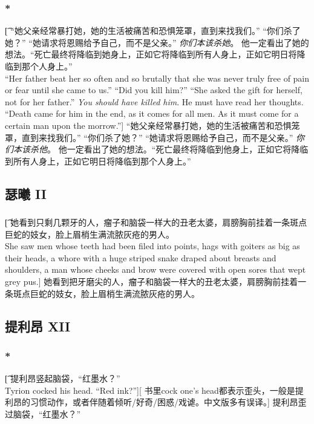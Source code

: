 \documentclass[12pt,a4paper]{article}
\begin{document}
\subsubsection{\color{red}*}\t[
	“她父亲经常暴打她，她的生活被痛苦和恐惧笼罩，直到来找我们。”
	“你们杀了她？”
	“她请求将恩赐给予自己，而不是父亲。”
	\emph{你们本该杀她}。
	他一定看出了她的想法。“死亡最终将降临到她身上，正如它将降临到所有人身上，正如它明日将降临到那个人身上。”\\
	“Her father beat her so often and so brutally that she was never truly free of pain or fear until she came to us.”
	“Did you kill him?”
	“She asked the gift for herself, not for her father.”
	\emph{You should have killed him}.
	He must have read her thoughts. “Death came for him in the end, as it comes for all men. As it must come for a certain man upon the morrow.”]
	“她父亲经常暴打她，她的生活被痛苦和恐惧笼罩，直到来找我们。”
	“你们杀了她？”
	“她请求将恩赐给予自己，而不是父亲。”
	\emph{你们本该杀他}。
	他一定看出了她的想法。“死亡最终将降临到他身上，正如它将降临到所有人身上，正如它明日将降临到那个人身上。”


\subsection{瑟曦 II}
\subsubsection{}\t[
	她看到只剩几颗牙的人，瘤子和脑袋一样大的丑老太婆，肩膀胸前挂着一条斑点巨蛇的妓女，脸上眉梢生满流脓灰疮的男人。\\
	She saw men whose teeth had been filed into points, hags with goiters as big as their heads, a whore with a huge striped snake draped about breasts and shoulders, a man whose cheeks and brow were covered with open sores that wept grey pus.]
	她看到把牙磨尖的人，瘤子和脑袋一样大的丑老太婆，肩膀胸前挂着一条斑点巨蛇的妓女，脸上眉梢生满流脓灰疮的男人。
	
\subsection{提利昂 XII}
\subsubsection{\color{red}*}\t[
	提利昂竖起脑袋，“红墨水？”\\
	Tyrion cocked his head. “Red ink?”][
	书里cock one's head都表示歪头，一般是提利昂的习惯动作，或者伴随着倾听/好奇/困惑/戏谑。中文版多有误译。]
	提利昂歪过脑袋，“红墨水？”
	
\end{document}
